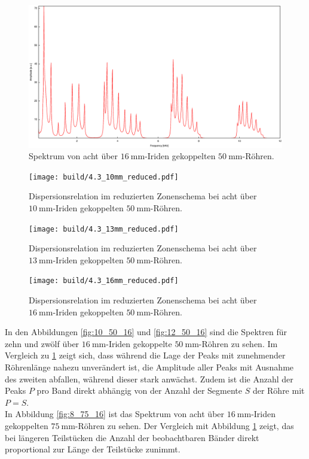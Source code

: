 \begin{figure}
\centering
\includegraphics[width=\linewidth-60pt,height=\textheight-60pt,keepaspectratio]{FP-V23data/4.3_400mm_16mm.eps}
\caption{Spektrum von acht über $\SI{16}{\milli\meter}$-Iriden gekoppelten $\SI{50}{\milli\meter}$-Röhren.}
\label{fig:8_50_16}
\end{figure}

\begin{figure}
\centering
\texttt{[image: build/4.3\_10mm\_reduced.pdf]}
\caption{Dispersionsrelation im reduzierten Zonenschema bei acht über $\SI{10}{\milli\meter}$-Iriden gekoppelten $\SI{50}{\milli\meter}$-Röhren.}
\label{fig:w_k_1}
\end{figure}

\begin{figure}
\centering
\texttt{[image: build/4.3\_13mm\_reduced.pdf]}
\caption{Dispersionsrelation im reduzierten Zonenschema bei acht über $\SI{13}{\milli\meter}$-Iriden gekoppelten $\SI{50}{\milli\meter}$-Röhren.}
\label{fig:w_k_2}
\end{figure}

\begin{figure}
\centering
\texttt{[image: build/4.3\_16mm\_reduced.pdf]}
\caption{Dispersionsrelation im reduzierten Zonenschema bei acht über $\SI{16}{\milli\meter}$-Iriden gekoppelten $\SI{50}{\milli\meter}$-Röhren.}
\label{fig:w_k_3}
\end{figure}

\newpage
\noindent In den Abbildungen \ref{fig:10_50_16} und \ref{fig:12_50_16} sind die Spektren für zehn und zwölf über $\SI{16}{\milli\meter}$-Iriden gekoppelte $\SI{50}{\milli\meter}$-Röhren zu sehen. Im Vergleich zu \ref{fig:8_50_16} zeigt sich, dass während die Lage der Peaks  mit zunehmender Röhrenlänge nahezu unverändert ist, die Amplitude aller Peaks mit Ausnahme des zweiten abfallen, während dieser stark anwächst. Zudem ist die Anzahl der Peaks $P$ pro Band direkt abhängig von der Anzahl der Segmente $S$ der Röhre mit $P=S$.\\
In Abbildung \ref{fig:8_75_16} ist das Spektrum von acht über $\SI{16}{\milli\meter}$-Iriden gekoppelten $\SI{75}{\milli\meter}$-Röhren zu sehen. Der Vergleich mit Abbildung \ref{fig:8_50_16} zeigt, das bei längeren Teilstücken die Anzahl der beobachtbaren Bänder direkt proportional zur Länge der Teilstücke zunimmt.\\

